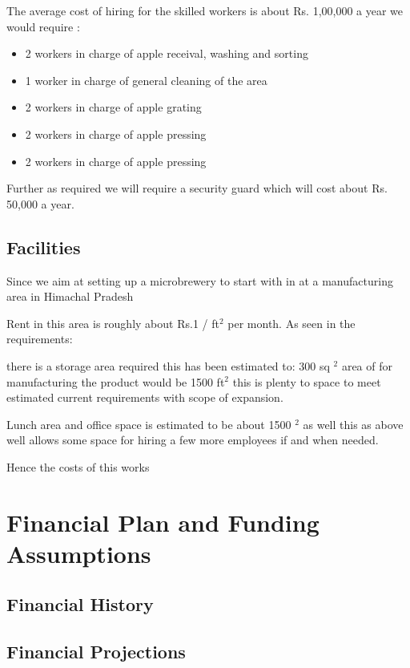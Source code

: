 \documentclass[11pt]{article}
\begin{document}
The average cost of hiring for the skilled workers is about Rs. 1,00,000 a year we would require :
\begin{itemize}

\item 2 workers in charge of apple receival, washing and sorting  
\item 1 worker in charge of general cleaning of the area
\item 2 workers in charge of apple grating
\item 2 workers in charge of apple pressing
\item 2 workers in charge of apple pressing 

\end{itemize}

Further as required we will require a security guard which will cost about Rs. 50,000 a year.
 
  \subsection{Facilities}
Since we aim at setting up a microbrewery to start with in at a manufacturing area in Himachal Pradesh

Rent in this area is roughly about Rs.1 / ft$^2$ per month.
As seen in the requirements:

there is a storage area required this has been estimated to: 300 sq $^2$
area of for manufacturing the product would be 1500 ft$^2$ this is plenty to space to meet estimated current requirements with scope of expansion.

Lunch area and office space is estimated to be about 1500 $^2$ as well this as above well allows some space for hiring a few more employees if and when needed.

Hence the costs of this works 
\section{Financial Plan and Funding Assumptions}
  \subsection{Financial History}
  \subsection{Financial Projections}
\end{document}
